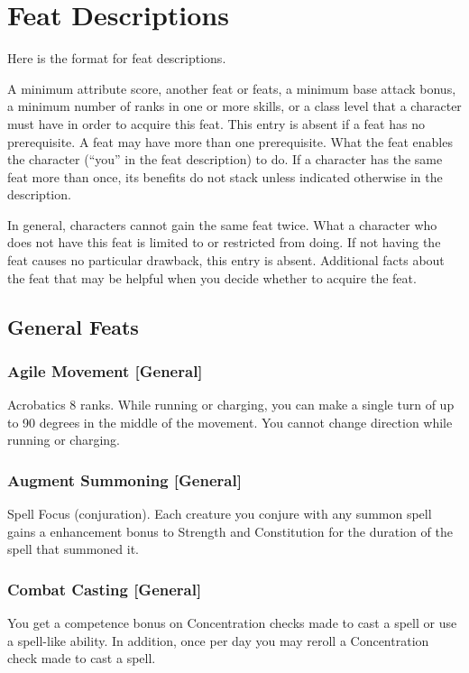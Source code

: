 \section{Feat Descriptions}
Here is the format for feat descriptions.

 A minimum attribute score, another feat or feats, a minimum base attack bonus, a minimum number of ranks in one or more skills, or a class level that a character must have in order to acquire this feat. This entry is absent if a feat has no prerequisite. A feat may have more than one prerequisite.
 What the feat enables the character (``you'' in the feat description) to do. If a character has the same feat more than once, its benefits do not stack unless indicated otherwise in the description.
\par In general, characters cannot gain the same feat twice.
 What a character who does not have this feat is limited to or restricted from doing. If not having the feat causes no particular drawback, this entry is absent.
 Additional facts about the feat that may be helpful when you decide whether to acquire the feat.

\subsection{General Feats}

\subsubsection{Agile Movement [General]}
 Acrobatics 8 ranks.
 While running or charging, you can make a single turn of up to 90 degrees in the middle of the movement.
 You cannot change direction while running or charging.

\subsubsection{Augment Summoning [General]}
 Spell Focus (conjuration).
 Each creature you conjure with any summon spell gains a  enhancement bonus to Strength and Constitution for the duration of the spell that summoned it.

\subsubsection{Combat Casting [General]}
 You get a  competence bonus on Concentration checks made to cast a spell or use a spell-like ability. In addition, once per day you may reroll a Concentration check made to cast a spell.

